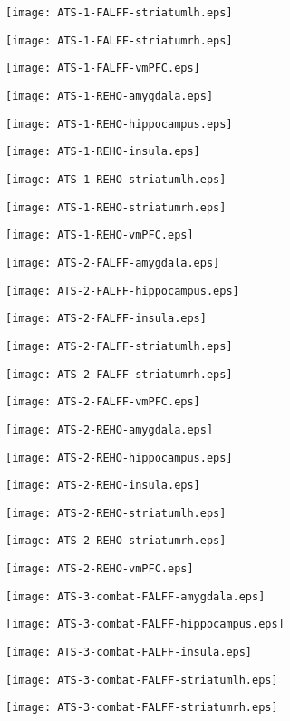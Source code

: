 \documentclass{article}
\begin{document}

\newpage
\texttt{[image: ATS-1-FALFF-striatumlh.eps]}

\newpage
\texttt{[image: ATS-1-FALFF-striatumrh.eps]}

\newpage
\texttt{[image: ATS-1-FALFF-vmPFC.eps]}

\newpage
\texttt{[image: ATS-1-REHO-amygdala.eps]}

\newpage
\texttt{[image: ATS-1-REHO-hippocampus.eps]}

\newpage
\texttt{[image: ATS-1-REHO-insula.eps]}

\newpage
\texttt{[image: ATS-1-REHO-striatumlh.eps]}

\newpage
\texttt{[image: ATS-1-REHO-striatumrh.eps]}

\newpage
\texttt{[image: ATS-1-REHO-vmPFC.eps]}

\newpage
\texttt{[image: ATS-2-FALFF-amygdala.eps]}

\newpage
\texttt{[image: ATS-2-FALFF-hippocampus.eps]}

\newpage
\texttt{[image: ATS-2-FALFF-insula.eps]}

\newpage
\texttt{[image: ATS-2-FALFF-striatumlh.eps]}

\newpage
\texttt{[image: ATS-2-FALFF-striatumrh.eps]}

\newpage
\texttt{[image: ATS-2-FALFF-vmPFC.eps]}

\newpage
\texttt{[image: ATS-2-REHO-amygdala.eps]}

\newpage
\texttt{[image: ATS-2-REHO-hippocampus.eps]}

\newpage
\texttt{[image: ATS-2-REHO-insula.eps]}

\newpage
\texttt{[image: ATS-2-REHO-striatumlh.eps]}

\newpage
\texttt{[image: ATS-2-REHO-striatumrh.eps]}

\newpage
\texttt{[image: ATS-2-REHO-vmPFC.eps]}

\newpage
\texttt{[image: ATS-3-combat-FALFF-amygdala.eps]}

\newpage
\texttt{[image: ATS-3-combat-FALFF-hippocampus.eps]}

\newpage
\texttt{[image: ATS-3-combat-FALFF-insula.eps]}

\newpage
\texttt{[image: ATS-3-combat-FALFF-striatumlh.eps]}

\newpage
\texttt{[image: ATS-3-combat-FALFF-striatumrh.eps]}

\end{document}
